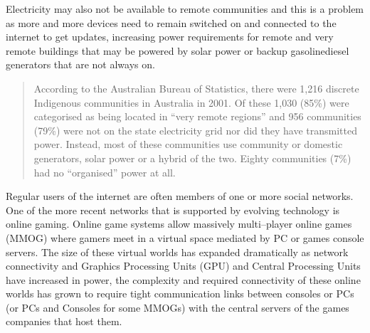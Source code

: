 Electricity may also not be available to remote communities and this is a problem as more and more devices need to remain switched on and connected to the internet to get updates, increasing power requirements for remote and very remote buildings that may be powered by solar power or backup gasoline\/diesel generators that are not always on.
\begin{quotation}
According to the Australian Bureau of Statistics, there were 1,216 discrete Indigenous communities in Australia in 2001. Of these 1,030 (85\%) were categorised as being located in ``very remote regions'' and 956 communities (79\%) were not on the state electricity grid nor did they have transmitted power. Instead, most of these communities use community or domestic generators, solar power or a hybrid of the two. Eighty communities (7\%) had no ``organised'' power at all\cite{RefWorks:450}.
\end{quotation}






Regular users of the internet are often members of one or more social networks. One of the more recent networks that is supported by evolving technology is online gaming. Online game systems allow massively multi--player online games (MMOG) where gamers meet in a virtual space mediated by PC or games console servers. The size of these virtual worlds has expanded dramatically as network connectivity and Graphics Processing Units (GPU) and Central Processing Units have increased in power, the complexity and required connectivity of these online worlds has grown to require tight communication links between consoles or PCs (or PCs and Consoles for some MMOGs) with the central servers of the games companies that host them. 

